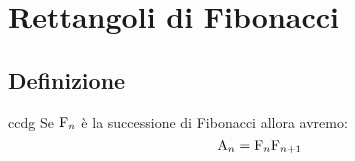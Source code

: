 \chapter{Rettangoli di Fibonacci}
\section{Definizione}
\begin{defn}
ccdg
	Se $\mathrm{F}_{n}$ è la successione di Fibonacci allora avremo:
	\begin{equation}
		\mathrm{A}_{n}=\mathrm{F}_{n}\mathrm{F}_{n+1}
	\end{equation}	
\end{defn}\cite{A001654}